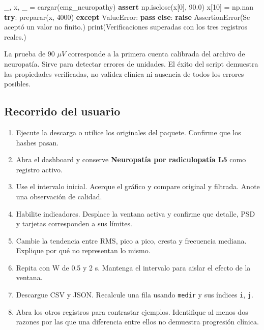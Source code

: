 \documentclass[
  spanish,
  10.5pt,
  a4paper,
  DIV=11,
  numbers=noendperiod]{scrartcl}
\newenvironment{Shaded}{\begin{snugshade}}{\end{snugshade}}
\newcommand{\BuiltInTok}[1]{\textcolor[rgb]{0.00,0.23,0.31}{#1}}
\newcommand{\ControlFlowTok}[1]{\textcolor[rgb]{0.00,0.23,0.31}{\textbf{#1}}}
\newcommand{\DecValTok}[1]{\textcolor[rgb]{0.68,0.00,0.00}{#1}}
\newcommand{\FloatTok}[1]{\textcolor[rgb]{0.68,0.00,0.00}{#1}}
\newcommand{\NormalTok}[1]{\textcolor[rgb]{0.00,0.23,0.31}{#1}}
\newcommand{\OperatorTok}[1]{\textcolor[rgb]{0.37,0.37,0.37}{#1}}
\newcommand{\PreprocessorTok}[1]{\textcolor[rgb]{0.68,0.00,0.00}{#1}}
\newcommand{\StringTok}[1]{\textcolor[rgb]{0.13,0.47,0.30}{#1}}
\providecommand{\tightlist}{%
  \setlength{\itemsep}{0pt}\setlength{\parskip}{0pt}}
\begin{document}
\begin{Shaded}
\begin{Highlighting}[]
\NormalTok{\_, x, \_ }\OperatorTok{=}\NormalTok{ cargar(}\StringTok{\textquotesingle{}emg\_neuropathy\textquotesingle{}}\NormalTok{)}
\ControlFlowTok{assert}\NormalTok{ np.isclose(x[}\DecValTok{0}\NormalTok{], }\FloatTok{90.0}\NormalTok{)}
\NormalTok{x[}\DecValTok{10}\NormalTok{] }\OperatorTok{=}\NormalTok{ np.nan}
\ControlFlowTok{try}\NormalTok{:}
\NormalTok{    preparar(x, }\DecValTok{4000}\NormalTok{)}
\ControlFlowTok{except} \PreprocessorTok{ValueError}\NormalTok{:}
    \ControlFlowTok{pass}
\ControlFlowTok{else}\NormalTok{:}
    \ControlFlowTok{raise} \PreprocessorTok{AssertionError}\NormalTok{(}\StringTok{\textquotesingle{}Se aceptó un valor no finito.\textquotesingle{}}\NormalTok{)}
\BuiltInTok{print}\NormalTok{(}\StringTok{\textquotesingle{}Verificaciones superadas con los tres registros reales.\textquotesingle{}}\NormalTok{)}
\end{Highlighting}
\end{Shaded}

La prueba de 90 \(\mu V\) corresponde a la primera cuenta calibrada del
archivo de neuropatía. Sirve para detectar errores de unidades. El éxito
del script demuestra las propiedades verificadas, no validez clínica ni
ausencia de todos los errores posibles.

\subsection{Recorrido del usuario}\label{recorrido-del-usuario}

\begin{enumerate}
\def\labelenumi{\arabic{enumi}.}
\tightlist
\item
  Ejecute la descarga o utilice los originales del paquete. Confirme que
  los hashes pasan.
\item
  Abra el dashboard y conserve \textbf{Neuropatía por radiculopatía L5}
  como registro activo.
\item
  Use el intervalo inicial. Acerque el gráfico y compare original y
  filtrada. Anote una observación de calidad.
\item
  Habilite indicadores. Desplace la ventana activa y confirme que
  detalle, PSD y tarjetas corresponden a sus límites.
\item
  Cambie la tendencia entre RMS, pico a pico, cresta y frecuencia
  mediana. Explique por qué no representan lo mismo.
\item
  Repita con W de 0.5 y 2 s. Mantenga el intervalo para aislar el efecto
  de la ventana.
\item
  Descargue CSV y JSON. Recalcule una fila usando \texttt{medir} y sus
  índices \texttt{i}, \texttt{j}.
\item
  Abra los otros registros para contrastar ejemplos. Identifique al
  menos dos razones por las que una diferencia entre ellos no demuestra
  progresión clínica.
\end{enumerate}
\end{document}

